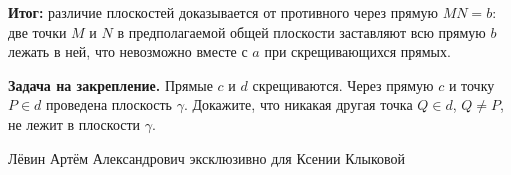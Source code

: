 \documentclass[12pt,a4paper]{article}
\begin{document}
\textcolor{teal!60!black}{\textbf{Итог:}} различие плоскостей доказывается от противного через прямую $MN=b$: две точки $M$ и $N$ в предполагаемой общей плоскости заставляют всю прямую $b$ лежать в ней, что невозможно вместе с $a$ при скрещивающихся прямых.

\textbf{Задача на закрепление.}
Прямые $c$ и $d$ скрещиваются. Через прямую $c$ и точку $P\in d$ проведена плоскость $\gamma$. Докажите, что никакая другая точка $Q\in d$, $Q\ne P$, не лежит в плоскости $\gamma$.

\vfill
\begin{center}
\small Лёвин Артём Александрович эксклюзивно для Ксении Клыковой
\end{center}
\end{document}
